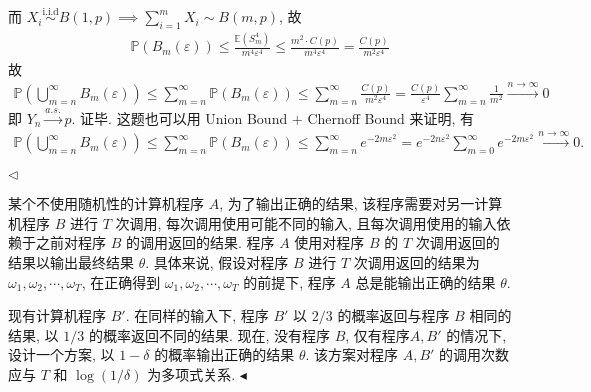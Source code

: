 \documentclass[11pt]{article}
\newenvironment{problem}[2][Problem]{\begin{trivlist}
    \item[\hskip \labelsep {\bfseries #1}\hskip \labelsep {\bfseries #2.}]\songti}{\hfill$\blacktriangleleft$\end{trivlist}}
\newenvironment{answer}[1][Solution]{\begin{trivlist}
    \item[\hskip \labelsep {\bfseries #1.}\hskip \labelsep]}{\hfill$\lhd$\end{trivlist}}
\newcommand\1{\mathds{1}}
\newcommand\E{\mathbb{E}}
\newcommand\PP{\mathbb{P}}
\newcommand{\arras}{\xrightarrow{a.s.}}
\newcommand{\arri}{\xrightarrow{n\rightarrow\infty}}
\newcommand{\iid}{\overset{\text{i.i.d}}{\sim}}
\begin{document}
\begin{answer}
\begin{enumerate}[label=(\arabic*)]
        而 $X_i \iid B(1,p) \implies \sum_{i=1}^{m}X_i \sim B(m, p)$, 故
        \begin{align*}
            \PP(B_m(\varepsilon)) \le \frac{\E(S_m^4)}{m^4\varepsilon^4} \le \frac{m^2 \cdot C(p)}{m^4 \varepsilon^4} = \frac{C(p)}{m^2 \varepsilon^4} 
        \end{align*}
        故
        \begin{align*}
            \PP\left( \bigcup_{m=n}^\infty B_m(\varepsilon) \right) \le \sum_{m=n}^\infty\PP(B_m(\varepsilon)) \le \sum_{m=n}^\infty \frac{C(p)}{m^2 \varepsilon^4}  = \frac{C(p)}{\varepsilon^4} \sum_{m=n}^\infty \frac{1}{m^2} \arri 0
        \end{align*}
        即 $Y_n \arras p$. 证毕. 这题也可以用 Union Bound + Chernoff Bound 来证明, 有
        \begin{align*}
            \PP\left(\bigcup_{m=n}^\infty B_m(\varepsilon)\right) \le \sum_{m=n}^\infty \PP(B_m(\varepsilon)) \le \sum_{m=n}^\infty e^{-2m\varepsilon^2} = e^{-2n\varepsilon^2} \sum_{m=0}^\infty e^{-2m\varepsilon^2} \arri 0.
        \end{align*}
    \end{enumerate}
\end{answer}

\begin{problem}{3}
    某个不使用随机性的计算机程序 $A$, 为了输出正确的结果, 该程序需要对另一计算机程序 $B$ 进行 $T$ 次调用,
    每次调用使用可能不同的输入, 且每次调用使用的输入依赖于之前对程序 $B$ 的调用返回的结果. 
    程序 $A$ 使用对程序 $B$ 的 $T$ 次调用返回的结果以输出最终结果 $\theta$. 
    具体来说, 假设对程序 $B$ 进行 $T$ 次调用返回的结果为 $\omega_1, \omega_2,\cdots, \omega_T$, 在正确得到 $\omega_1, \omega_2,\cdots, \omega_T$ 的前提下, 
    程序 $A$ 总是能输出正确的结果 $\theta$.
    
    现有计算机程序 $B'$. 在同样的输入下, 程序 $B'$ 以 $2/3$ 的概率返回与程序 $B$ 相同的结果, 以 $1/3$ 的概率返回不同的结果.
    现在, 没有程序 $B$, 仅有程序$A, B'$ 的情况下, 设计一个方案, 以 $1-\delta$ 的概率输出正确的结果 $\theta$.
    该方案对程序 $A, B'$ 的调用次数应与 $T$ 和 $\log(1/\delta)$ 为多项式关系.
\end{problem}
\end{document}
